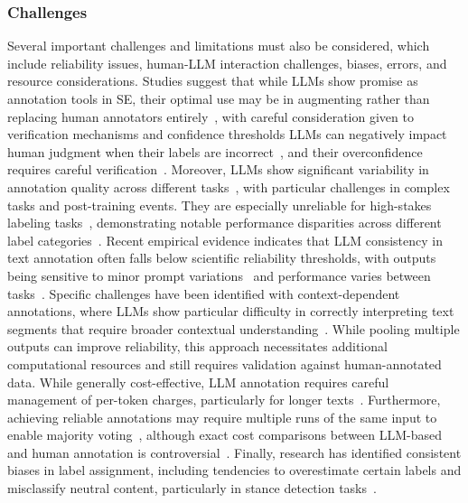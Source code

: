 \documentclass[11pt]{article}
\begin{document}
\subsubsection{Challenges}

Several important challenges and limitations must also be considered, which include reliability issues, human-LLM interaction challenges, biases, errors, and resource considerations.
Studies suggest that while LLMs show promise as annotation tools in SE, their optimal use may be in augmenting rather than replacing human annotators entirely~\cite{DBLP:conf/emnlp/WangLXZZ21, DBLP:conf/chi/HeHDRH24}, with careful consideration given to verification mechanisms and confidence thresholds
LLMs can negatively impact human judgment when their labels are incorrect~\cite{DBLP:conf/www/HuangKA23a}, and their overconfidence requires careful verification~\cite{DBLP:conf/kdd/WanSJKCNSSWYABJ24}.
Moreover, LLMs show significant variability in annotation quality across different tasks~\cite{DBLP:conf/www/HuangKA23a,DBLP:conf/chi/Wang0RMM24}, with particular challenges in complex tasks and post-training events. They are especially unreliable for high-stakes labeling tasks~\cite{DBLP:conf/chi/Wang0RMM24}, demonstrating notable performance disparities across different label categories~\cite{DBLP:journals/corr/abs-2304-10145}. Recent empirical evidence indicates that LLM consistency in text annotation often falls below scientific reliability thresholds, with outputs being sensitive to minor prompt variations~\cite{DBLP:journals/corr/abs-2304-11085} and performance varies between tasks~\cite{DBLP:journals/corr/abs-2306-00176}. Specific challenges have been identified with context-dependent annotations, where LLMs show particular difficulty in correctly interpreting text segments that require broader contextual understanding~\cite{DBLP:conf/chi/HeHDRH24}.
While pooling multiple outputs can improve reliability, this approach necessitates additional computational resources and still requires validation against human-annotated data.
While generally cost-effective, LLM annotation requires careful management of per-token charges, particularly for longer texts~\cite{DBLP:conf/emnlp/WangLXZZ21}. Furthermore, achieving reliable annotations may require multiple runs of the same input to enable majority voting~\cite{DBLP:journals/corr/abs-2304-11085}, although exact cost comparisons between LLM-based and human annotation is controversial~\cite{DBLP:conf/chi/HeHDRH24}.
Finally, research has identified consistent biases in label assignment, including tendencies to overestimate certain labels and misclassify neutral content, particularly in stance detection tasks~\cite{DBLP:journals/corr/abs-2304-10145}. %
\end{document}
